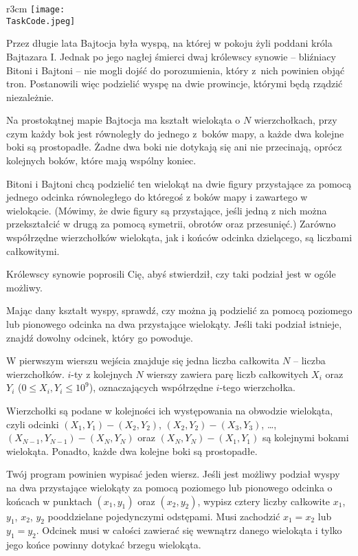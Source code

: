 \documentclass{boi2014-pl}
\renewcommand{\TaskCode}{demarcation}
\begin{document}
    \begin{wrapfigure}{r}{3cm}
        \vspace{-24pt}
		\texttt{[image: \\TaskCode.jpeg]}
	\end{wrapfigure}

    Przez długie lata Bajtocja była wyspą, na której w pokoju żyli poddani króla Bajtazara I.
  Jednak po jego nagłej śmierci dwaj królewscy synowie -- bliźniacy Bitoni i Bajtoni -- nie
  mogli dojść do porozumienia, który z~nich powinien objąć tron. Postanowili więc podzielić
  wyspę na dwie prowincje, którymi będą rządzić niezależnie.

  Na prostokątnej mapie Bajtocja ma kształt wielokąta o $N$ wierzchołkach, przy czym każdy bok jest równoległy
  do jednego z~boków mapy, a każde dwa kolejne boki są prostopadłe.
  Żadne dwa boki nie dotykają się ani nie przecinają, oprócz kolejnych boków, które mają wspólny koniec.
  
  Bitoni i Bajtoni chcą podzielić ten wielokąt na dwie figury przystające za pomocą
  jednego odcinka równoległego do któregoś z boków mapy i zawartego w wielokącie.
  (Mówimy, że dwie figury są przystające, jeśli jedną z nich można przekształcić w drugą za pomocą symetrii, obrotów oraz przesunięć.)
  Zarówno współrzędne wierzchołków wielokąta, jak i końców odcinka dzielącego, są liczbami całkowitymi.

  Królewscy synowie poprosili Cię, abyś stwierdził, czy taki podział jest
  w ogóle możliwy.

    \Task

    Mając dany kształt wyspy, sprawdź, czy można ją podzielić za pomocą poziomego lub pionowego
    odcinka na dwa przystające wielokąty.
    Jeśli taki podział istnieje, znajdź dowolny odcinek, który go powoduje.

    \Input
	W pierwszym wierszu wejścia znajduje się jedna liczba całkowita $N$ -- liczba wierzchołków.
        $i$-ty z kolejnych $N$ wierszy zawiera parę liczb całkowitych $X_i$ oraz $Y_i$ ($0 \le X_i, Y_i \le 10^9$), oznaczających współrzędne $i$-tego wierzchołka.

        Wierzchołki są podane w kolejności ich występowania na obwodzie wielokąta,
        czyli odcinki $(X_1,Y_1) - (X_2,Y_2)$,
    $(X_2,Y_2) - (X_3,Y_3)$, \ldots, $(X_{N-1},Y_{N-1}) - (X_N,Y_N)$ oraz
    $(X_N,Y_N) - (X_1,Y_1)$ są kolejnymi bokami wielokąta.
        Ponadto, każde dwa kolejne boki są prostopadłe.

	\Output
        Twój program powinien wypisać jeden wiersz.
        Jeśli jest możliwy podział wyspy na dwa przystające wielokąty za pomocą poziomego lub pionowego odcinka o
        końcach w punktach $(x_1,y_1)$ oraz $(x_2,y_2)$, wypisz cztery liczby całkowite $x_1$, $y_1$, $x_2$, $y_2$ pooddzielane pojedynczymi odstępami.
        Musi zachodzić $x_1 = x_2$ lub $y_1 = y_2$.
        Odcinek musi w całości zawierać się wewnątrz danego wielokąta i tylko jego końce powinny dotykać brzegu wielokąta.
 
\end{document}
